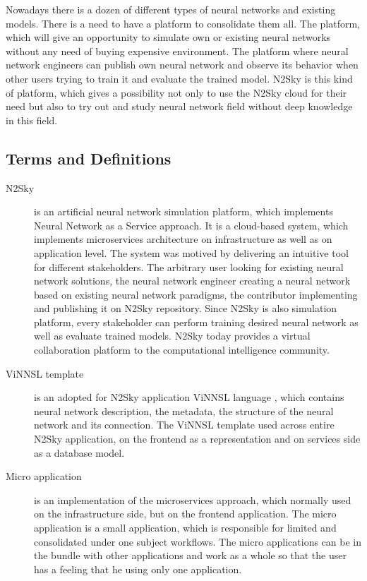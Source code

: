 Nowadays there is a dozen of different types of neural networks and existing models. There is a need to have a platform to consolidate them all. The platform, which will give an opportunity to simulate own or existing neural networks without any need of buying expensive environment. The platform where neural network engineers can publish own neural network and observe its behavior when other users trying to train it and evaluate the trained model. N2Sky is this kind of platform, which gives a possibility not only to use the N2Sky cloud for their need but also to try out and study neural network field without deep knowledge in this field. 



\subsection{Terms and Definitions}\label{Terms and definitions}

\begin{description}
\item[N2Sky] is an artificial neural network simulation platform, which implements Neural Network as a Service approach. It is a cloud-based system, which implements microservices architecture on infrastructure as well as on application level. The system was motived by delivering an intuitive tool for different stakeholders. The arbitrary user looking for existing neural network solutions, the neural network engineer creating a neural network based on existing neural network paradigms, the contributor implementing and publishing it on N2Sky repository. Since N2Sky is also simulation platform, every stakeholder can perform training desired neural network as well as evaluate trained models.  N2Sky today provides a virtual collaboration platform to the computational intelligence community.
\item[ViNNSL template] is an adopted for N2Sky application ViNNSL language \cite{Beran2008} , which contains neural network description, the metadata, the structure of the neural network and its connection. The ViNNSL template used across entire N2Sky application, on the frontend as a representation and on services side as a database model.
\item[Micro application] is an implementation of the microservices approach, which normally used on the infrastructure side, but on the frontend application. The micro application is a small application, which is responsible for limited and consolidated under one subject workflows. The micro applications can be in the bundle with other applications and work as a whole so that the user has a feeling that he using only one application.
\end{description}



